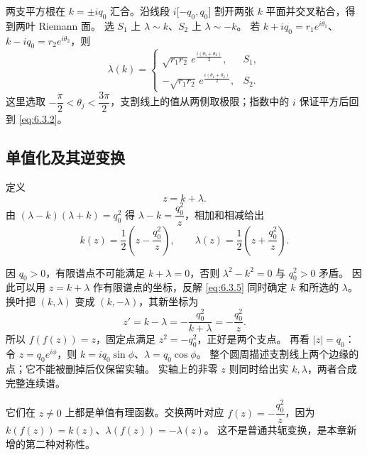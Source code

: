 \documentclass[lang=cn,scheme=chinese,mode=simple,device=normal,color=blue,
math=cm,thmcnt=section,12pt]{elegantbook}
\newcommand{\eqq}[2]{\tag{#1}\label{eq:#1}#2}
\begin{document}
两支平方根在 $k=\pm iq_0$ 汇合。沿线段 $i\lbrack-q_0,q_0\rbrack$ 割开两张 $k$ 平面并交叉粘合，得到两叶 Riemann 面。
选 $S_1$ 上 $\lambda\sim k$、$S_2$ 上 $\lambda\sim-k$。
若 $k+iq_0=r_1e^{i\theta_1}$、$k-iq_0=r_2e^{i\theta_2}$，则
\begin{equation}
    \eqq{6.3.3}{\lambda(k)=
        \begin{cases}
            \sqrt{r_1r_2}\,e^{\frac{i(\theta_1+\theta_2)}{2}},  & S_1, \\
            -\sqrt{r_1r_2}\,e^{\frac{i(\theta_1+\theta_2)}{2}}, & S_2.
        \end{cases}}
\end{equation}
这里选取 $-\dfrac{\pi}{2}<\theta_j<\dfrac{3\pi}{2}$，支割线上的值从两侧取极限；指数中的 $i$ 保证平方后回到 \eqref{eq:6.3.2}。

\subsection{单值化及其逆变换}
定义
\begin{equation}\eqq{6.3.4}{z=k+\lambda.}\end{equation}
由 $(\lambda-k)(\lambda+k)=q_0^2$ 得 $\lambda-k=\dfrac{q_0^2}{z}$，相加和相减给出
\begin{equation}\eqq{6.3.5}{k(z)=\dfrac{1}{2}\left(z-\dfrac{q_0^2}{z}\right),\qquad
        \lambda(z)=\dfrac{1}{2}\left(z+\dfrac{q_0^2}{z}\right).}\end{equation}

\begin{callout}[计算：单值化不是丢掉第二个根]
    因 $q_0>0$，有限谱点不可能满足 $k+\lambda=0$，否则 $\lambda^2-k^2=0$ 与 $q_0^2>0$ 矛盾。
    因此可以用 $z=k+\lambda$ 作有限谱点的坐标，反解 \eqref{eq:6.3.5} 同时确定 $k$ 和所选的 $\lambda$。
    换叶把 $(k,\lambda)$ 变成 $(k,-\lambda)$，其新坐标为
    \[
        z'=k-\lambda=-\dfrac{q_0^2}{k+\lambda}=-\dfrac{q_0^2}{z}.
    \]
    所以 $f(f(z))=z$，固定点满足 $z^2=-q_0^2$，正好是两个支点。
    再看 $|z|=q_0$：令 $z=q_0e^{i\phi}$，则
    $k=iq_0\sin\phi$、$\lambda=q_0\cos\phi$。
    整个圆周描述支割线上两个边缘的点；它不能被删掉后仅保留实轴。
    实轴上的非零 $z$ 则同时给出实 $k,\lambda$，两者合成完整连续谱。
\end{callout}


它们在 $z\ne0$ 上都是单值有理函数。交换两叶对应
$f(z)=-\dfrac{q_0^2}{z}$，因为 $k(f(z))=k(z)$、$\lambda(f(z))=-\lambda(z)$。
这不是普通共轭变换，是本章新增的第二种对称性。
\end{document}
